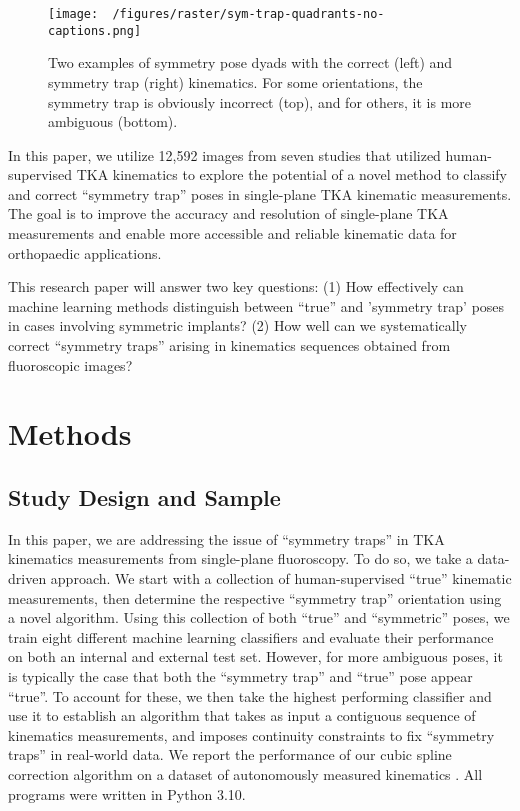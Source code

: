 \begin{figure}[h!]
	\centering
	\texttt{[image: ~/figures/raster/sym-trap-quadrants-no-captions.png]}
	\caption{Two examples of symmetry pose dyads with the correct (left) and symmetry trap (right) kinematics. For some orientations, the symmetry trap is obviously incorrect (top), and for others, it is more ambiguous (bottom).}
	\label{fig:symmetry-trap-quadrants}
\end{figure}


In this paper, we utilize 12,592 images from seven studies that utilized human-supervised TKA kinematics \cite{jennyREGISTRATIONKNEEKINEMATICS2015,kefalaAssessmentKneeKinematics2017,okamotoVivoKneeKinematics2011,palm-vlasakMinimalVariationTop2022,scottCanTotalKnee2016,watanabeKneeKinematicsAnterior2013,watanabeInvivoKinematicsHighflex2016} to explore the potential of a novel method to classify and correct ``symmetry trap'' poses in single-plane TKA kinematic measurements.
The goal is to improve the accuracy and resolution of single-plane TKA measurements and enable more accessible and reliable kinematic data for orthopaedic applications.

This research paper will answer two key questions:  (1) How effectively can machine learning methods distinguish between ``true'' and 'symmetry trap' poses in cases involving symmetric implants? (2) How well can we systematically correct ``symmetry traps'' arising in kinematics sequences obtained from fluoroscopic images?

\section{Methods}
\subsection{Study Design and Sample}
In this paper, we are addressing the issue of “symmetry traps” in TKA kinematics measurements from single-plane fluoroscopy.
To do so, we take a data-driven approach.
We start with a collection of human-supervised “true” kinematic measurements, then determine the respective “symmetry trap” orientation using a novel algorithm.
Using this collection of both “true” and “symmetric” poses, we train eight different machine learning classifiers and evaluate their performance on both an internal and external test set.
However, for more ambiguous poses, it is typically the case that both the “symmetry trap” and “true” pose appear “true”.
To account for these, we then take the highest performing classifier and use it to establish an algorithm that takes as input a contiguous sequence of kinematics measurements, and imposes continuity constraints to fix “symmetry traps” in real-world data.
We report the performance of our cubic spline correction algorithm on a dataset of autonomously measured kinematics \cite{jensenJointTrackMachine2023}.
All programs were written in Python 3.10.

